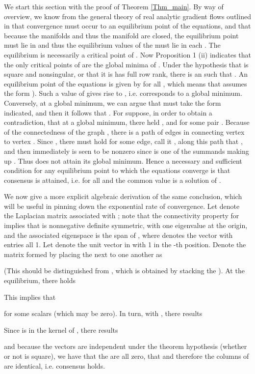 \documentclass{aims}
\begin{document}
We start this section with the proof of Theorem \ref{Thm_main}. By way of overview, we know from the general theory of
 real analytic gradient flows outlined in \cite{KTA00Math} that convergence must occur to an equilibrium point of the equations, and that because the manifolds  and thus the manifold  are closed, the equilibrium point must lie in  and thus the equilibrium values of the  must lie in each . The equilibrium is necessarily a critical point of . Now Proposition 1 (ii) indicates that the only critical points of  are the global minima of . Under the hypothesis that  is square and nonsingular, or that it is has full row rank, there is an  such that . An equilibrium point of the equations is given by  for all , which means that   assumes the form ). Such a value of  gives rise to , i.e. corresponds to a global minimum. Conversely, at a global minimum, we can argue that   must take the form indicated, and then it follows that . For suppose, in order to obtain a contradiction, that at a global minimum, there held , and  for some pair . Because of the connectedness of the graph , there is a path of edges in  connecting vertex  to vertex . Since , there must hold for some edge, call it , along this path that , and then immediately  is seen to be nonzero since  is one of the summands making up .
Thus  does not attain its global minimum. Hence a necessary and sufficient condition for any equilibrium point to which the equations converge is that consensus is attained, i.e.  for all  and the common value is a solution of .

 We now give a more explicit algebraic derivation of the same conclusion, which will be useful in pinning down the exponential rate of convergence.
Let  denote the Laplacian matrix associated with ; note
that the connectivity property for  implies that  is
nonnegative definite symmetric, with one eigenvalue at the origin, and
the associated eigenspace is the span of ,
  where  denotes the vector with entries all 1. Let 
denote the unit vector in  with 1 in the -th position. Denote the
matrix formed by placing the   next to one another as
 
(This should be distinguished from , which is obtained by stacking the ). At the equilibrium, there holds

This implies that

for some scalars  (which may be zero). In turn, with  , there results

Since  is in the kernel of , there results

and because the vectors  are independent under the theorem hypothesis (whether or not  is square), we have that the  are all zero, that  and therefore the columns of  are identical, i.e. consensus holds.
\end{document}
